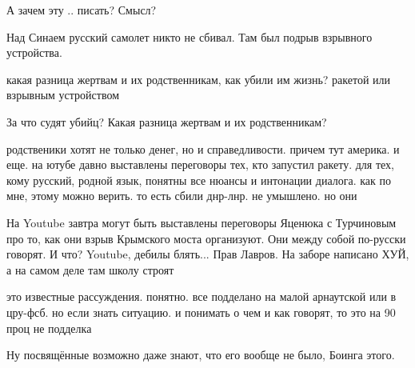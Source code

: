\begin{itemize}
А зачем эту .. писать? Смысл?

Над Синаем русский самолет никто не сбивал. Там был подрыв взрывного устройства.

\begin{itemize} %
какая разница жертвам и их родственникам, как убили им жизнь? ракетой или взрывным устройством

За что судят убийц? Какая разница жертвам и их родственникам?
\end{itemize} %


родственики хотят не только денег, но и справедливости. причем тут америка. и
еще. на ютубе давно выставлены переговоры тех, кто запустил ракету. для тех,
кому русский, родной язык, понятны все нюансы и интонации диалога. как по мне,
этому можно верить. то есть сбили днр-лнр. не умышлено. но они



На Youtube завтра могут быть выставлены переговоры Яценюка с Турчиновым про то,
как они взрыв Крымского моста организуют. Они между собой по-русски говорят. И
что? Youtube, дебилы блять... Прав Лавров. На заборе написано ХУЙ, а на самом
деле там школу строят


это известные рассуждения. понятно. все подделано на малой арнаутской или в
цру-фсб. но если знать ситуацию. и понимать о чем и как говорят, то это на 90
проц не подделка

Ну посвящённые возможно даже знают, что его вообще не было, Боинга этого.

\end{itemize} %
